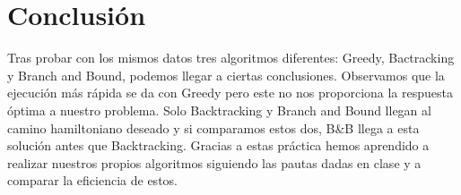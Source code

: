 \documentclass[a4]{article}
\begin{document}
\section{Conclusión}
Tras probar con los mismos datos tres algoritmos diferentes: Greedy, Bactracking y Branch and Bound, podemos llegar a ciertas conclusiones. Observamos que la ejecución más rápida se da con Greedy pero este no nos proporciona la respuesta óptima a nuestro problema. Solo Backtracking y Branch and Bound llegan al camino hamiltoniano deseado y si comparamos estos dos, B\&B llega a esta solución antes que Backtracking. Gracias a estas práctica hemos aprendido a realizar nuestros propios algoritmos siguiendo las pautas dadas en clase y a comparar la eficiencia de estos.
\end{document}
